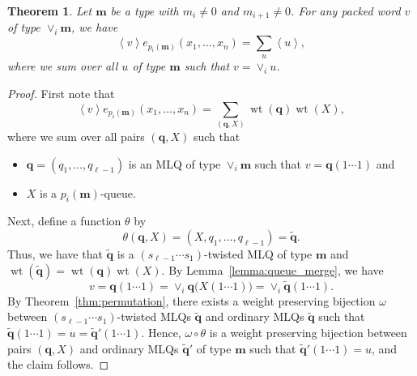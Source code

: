 \documentclass[reqno]{amsart}
\newcommand{\0}{\phantom{c}}
\newcommand{\swt}[1]{\left\langle #1 \right\rangle} %
\newcommand{\merge}[1]{\vee_{#1}} %
\DeclareMathOperator{\wt}{wt} %
\newcommand{\mm}{\mathbf{m}}
\newcommand{\qq}{\mathbf{q}}
\let\sumnonlimits\sum
\renewcommand{\sum}{\sumnonlimits\limits}
\theoremstyle{plain}
\newtheorem{thm}{Theorem}[section]
\theoremstyle{definition}
\numberwithin{equation}{section}
\begin{document}
\begin{thm}
\label{thm:merge}
  Let $\mm$ be a type with $m_i \neq 0$ and $m_{i+1} \neq 0$.
  For any packed word $v$ of type $\merge{i}\mm$, we have
\[
  \swt{v} e_{p_i(\mm)}(x_1, \dotsc, x_n) = \sum_u \swt{u},
\]
where we sum over all $u$ of type $\mm$ such that $v = \merge{i} u$.
\end{thm}

\begin{proof}
  First note that
  \[
  \swt{v} e_{p_i(\mm)}(x_1, \dotsc, x_n) = \sum_{(\qq,X)} \wt(\qq) \wt(X),
  \]
  where we sum over all pairs $(\qq, X)$ such that
  \begin{itemize}
  \item $\qq = (q_1, \dotsc, q_{\ell-1})$ is an MLQ of type $\merge{i}\mm$ such that $v = \qq(1\cdots1)$ and
  \item $X$ is a $p_i(\mm)$-queue.
  \end{itemize}
  Next, define a function $\theta$ by
  \[
  \theta(\qq, X) = (X, q_1, \dotsc, q_{\ell-1}) = \widetilde{\qq}.
  \]
  Thus, we have that $\widetilde{\qq}$ is a $(s_{\ell-1} \dotsm s_1)$-twisted MLQ of type $\mm$ and $\wt(\widetilde{\qq}) = \wt(\qq) \wt(X) $.
  By Lemma~\ref{lemma:queue_merge}, we have
  \[
  v = \qq(1 \dotsm 1) = \merge{i} \qq\bigl( X(1 \dotsm 1) \bigr) = \merge{i} \widetilde{\qq}(1 \dotsm 1).
  \]
  By Theorem~\ref{thm:permutation}, there exists a weight preserving bijection $\omega$ between $(s_{\ell-1} \dotsm s_1)$-twisted MLQs $\widetilde{\qq}$ and ordinary MLQs $\widetilde{\qq}$ such that $\widetilde{\qq}(1 \dotsm 1) = u = \widetilde{\qq}'(1 \dotsm 1)$.
  Hence, $\omega \circ \theta$ is a weight preserving bijection between pairs $(\qq, X)$ and ordinary MLQs $\widetilde{\qq}'$ of type $\mm$ such that $\widetilde{\qq}'(1 \dotsm 1) = u$, and the claim follows.
\end{proof}
\end{document}
